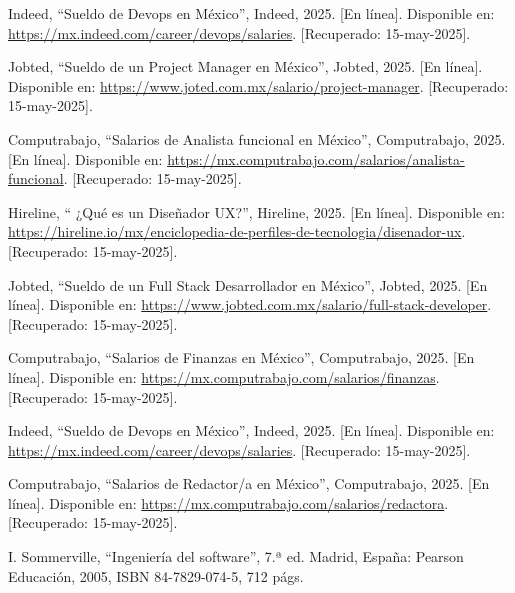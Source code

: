 \begin{thebibliography}{200}
    Indeed, “Sueldo de Devops en México”, Indeed, 2025. [En línea]. Disponible en: \url{https://mx.indeed.com/career/devops/salaries}. [Recuperado: 15-may-2025].

    Jobted, “Sueldo de un Project Manager en México”, Jobted, 2025. [En línea]. Disponible en: \url{https://www.joted.com.mx/salario/project-manager}. [Recuperado: 15-may-2025].

    Computrabajo, “Salarios de Analista funcional en México”, Computrabajo, 2025. [En línea]. Disponible en: \url{https://mx.computrabajo.com/salarios/analista-funcional}. [Recuperado: 15-may-2025].

    Hireline, “ ¿Qué es un Diseñador UX?”, Hireline, 2025. [En línea]. Disponible en: \url{https://hireline.io/mx/enciclopedia-de-perfiles-de-tecnologia/disenador-ux}. [Recuperado: 15-may-2025].

    Jobted, “Sueldo de un Full Stack Desarrollador en México”, Jobted, 2025. [En línea]. Disponible en: \url{https://www.jobted.com.mx/salario/full-stack-developer}. [Recuperado: 15-may-2025].

    Computrabajo, “Salarios de Finanzas en México”, Computrabajo, 2025. [En línea]. Disponible en: \url{https://mx.computrabajo.com/salarios/finanzas}. [Recuperado: 15-may-2025].

    Indeed, “Sueldo de Devops en México”, Indeed, 2025. [En línea]. Disponible en: \url{https://mx.indeed.com/career/devops/salaries}. [Recuperado: 15-may-2025].

    Computrabajo, “Salarios de Redactor/a en México”, Computrabajo, 2025. [En línea]. Disponible en: \url{https://mx.computrabajo.com/salarios/redactora}. [Recuperado: 15-may-2025].

    I. Sommerville, “Ingeniería del software”, 7.ª ed. Madrid, España: Pearson Educación, 2005, ISBN 84-7829-074-5, 712 págs.
\end{thebibliography}
